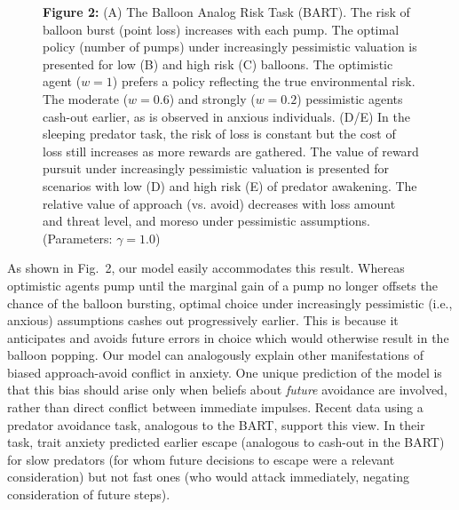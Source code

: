\documentclass[11pt]{article} %
\begin{document}
\begin{figure}
  \centerline{%
  }
  \par \textbf{Figure 2:} (A) The Balloon Analog Risk Task (BART). The risk of balloon burst (point loss) increases with each pump. The optimal policy (number of pumps) under increasingly pessimistic valuation is presented for low (B) and high risk (C) balloons. The optimistic agent ($w=1$) prefers a policy reflecting the true environmental risk. The moderate ($w=0.6$) and strongly ($w=0.2$) pessimistic agents cash-out earlier, as is observed in anxious individuals. (D/E) In the sleeping predator task, the risk of loss is constant but the cost of loss still increases as more rewards are gathered. The value of reward pursuit under increasingly pessimistic valuation is presented for scenarios with low (D) and high risk (E)  of predator awakening. The relative value of approach (vs. avoid) decreases with loss amount and threat level, and moreso under pessimistic assumptions. (Parameters: $\gamma = 1.0$)
\end{figure}

As shown in Fig.~2, our model easily accommodates this result. Whereas optimistic agents pump until the marginal gain of a pump no longer offsets the chance of the balloon bursting, optimal choice under increasingly pessimistic (i.e., anxious) assumptions cashes out progressively earlier. This is because it anticipates and avoids future errors in choice which would otherwise result in the balloon popping. Our model can analogously explain other manifestations of biased approach-avoid conflict in anxiety\cite{fung2019}. One unique prediction of the model is that this bias should arise only when beliefs about \emph{future} avoidance are involved, rather than direct conflict between immediate impulses. Recent data \cite{fung2019} using a predator avoidance task, analogous to the BART, support this view. In their task, trait anxiety predicted earlier escape (analogous to cash-out in the BART) for slow predators (for whom future decisions to escape were a relevant consideration) but not fast ones (who would attack immediately, negating consideration of future steps). 
\end{document}
